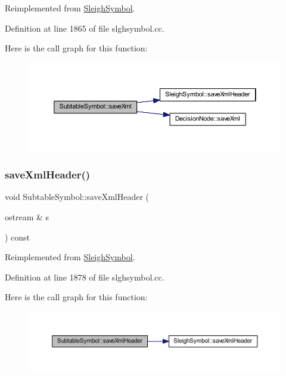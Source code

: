 Reimplemented from \mbox{\hyperlink{class_sleigh_symbol_a83c9a32d16419d2277c5b9d542e1cf13}{Sleigh\+Symbol}}.



Definition at line 1865 of file slghsymbol.\+cc.

Here is the call graph for this function\+:
\nopagebreak
\begin{figure}[H]
\begin{center}
\leavevmode
\includegraphics[width=350pt]{class_subtable_symbol_afe8d899ddb52fcdc4b26510042015b8b_cgraph}
\end{center}
\end{figure}
\mbox{\label{class_subtable_symbol_a6209b1dc388be3cc89a6834e2660cf24}} 
\subsubsection{\texorpdfstring{saveXmlHeader()}{saveXmlHeader()}}
{\footnotesize\ttfamily void Subtable\+Symbol\+::save\+Xml\+Header (\begin{DoxyParamCaption}\item[{ostream \&}]{s }\end{DoxyParamCaption}) const\hspace{0.3cm}{\ttfamily [virtual]}}



Reimplemented from \mbox{\hyperlink{class_sleigh_symbol_ac501be7c584bc0568c29fb95910962e9}{Sleigh\+Symbol}}.



Definition at line 1878 of file slghsymbol.\+cc.

Here is the call graph for this function\+:
\nopagebreak
\begin{figure}[H]
\begin{center}
\leavevmode
\includegraphics[width=350pt]{class_subtable_symbol_a6209b1dc388be3cc89a6834e2660cf24_cgraph}
\end{center}
\end{figure}


